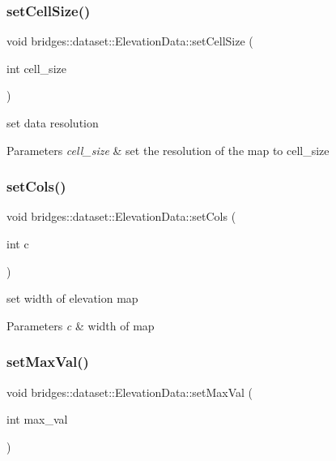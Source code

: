 \subsubsection{\texorpdfstring{set\+Cell\+Size()}{setCellSize()}}
{\footnotesize\ttfamily void bridges\+::dataset\+::\+Elevation\+Data\+::set\+Cell\+Size (\begin{DoxyParamCaption}\item[{int}]{cell\+\_\+size }\end{DoxyParamCaption})\hspace{0.3cm}{\ttfamily [inline]}}

set data resolution 
\begin{DoxyParams}{Parameters}
{\em cell\+\_\+size} & set the resolution of the map to cell\+\_\+size \\
\hline
\end{DoxyParams}
\mbox{\label{classbridges_1_1dataset_1_1_elevation_data_adf57abd5e1e058ca6b0eb093aa5c7a11}} 
\subsubsection{\texorpdfstring{set\+Cols()}{setCols()}}
{\footnotesize\ttfamily void bridges\+::dataset\+::\+Elevation\+Data\+::set\+Cols (\begin{DoxyParamCaption}\item[{int}]{c }\end{DoxyParamCaption})\hspace{0.3cm}{\ttfamily [inline]}}

set width of elevation map 
\begin{DoxyParams}{Parameters}
{\em c} & width of map \\
\hline
\end{DoxyParams}
\mbox{\label{classbridges_1_1dataset_1_1_elevation_data_ae21e8da36d7b7ad93121aff7ef6d69ab}} 
\subsubsection{\texorpdfstring{set\+Max\+Val()}{setMaxVal()}}
{\footnotesize\ttfamily void bridges\+::dataset\+::\+Elevation\+Data\+::set\+Max\+Val (\begin{DoxyParamCaption}\item[{int}]{max\+\_\+val }\end{DoxyParamCaption})\hspace{0.3cm}{\ttfamily [inline]}}

